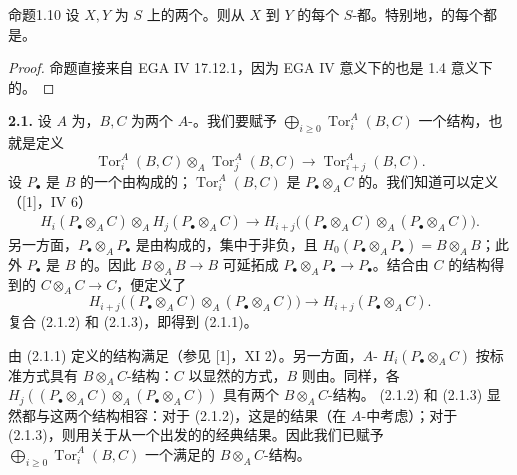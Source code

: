 \begin{SGAresult}{命题}{1.10}
设 $X,Y$ 为 $S$ 上的两个。则从 $X$ 到 $Y$ 的每个 $S$-都。特别地，的每个都是。
\end{SGAresult}
\begin{proof}
命题直接来自 EGA IV 17.12.1，因为 EGA IV 意义下的也是 1.4 意义下的。
\end{proof}

\textbf{2.1.} 设 $A$ 为，$B,C$ 为两个 $A$-。我们要赋予 $\bigoplus_{i\geq0}\operatorname{Tor}_i^A(B,C)$ 一个结构，也就是定义
\[
\operatorname{Tor}_i^A(B,C)\otimes_A\operatorname{Tor}_j^A(B,C)\longrightarrow\operatorname{Tor}_{i+j}^A(B,C).\tag{2.1.1}
\]
设 $P_\bullet$ 是 $B$ 的一个由构成的；$\operatorname{Tor}_i^A(B,C)$ 是 $P_\bullet\otimes_A C$ 的。我们知道可以定义（[1]，IV 6）
\[
\begin{split}
H_i(P_\bullet\otimes_A C)\otimes_A H_j(P_\bullet\otimes_A C)
\longrightarrow H_{i+j}\bigl((P_\bullet\otimes_A C)\otimes_A(P_\bullet\otimes_A C)\bigr).
\end{split}\tag{2.1.2}
\]
另一方面，$P_\bullet\otimes_A P_\bullet$ 是由构成的，集中于非负，且 $H_0(P_\bullet\otimes_A P_\bullet)=B\otimes_A B$；此外 $P_\bullet$ 是 $B$ 的。因此 $B\otimes_A B\to B$ 可延拓成 $P_\bullet\otimes_A P_\bullet\to P_\bullet$。结合由 $C$ 的结构得到的 $C\otimes_A C\to C$，便定义了
\[
H_{i+j}\bigl((P_\bullet\otimes_A C)\otimes_A(P_\bullet\otimes_A C)\bigr)
\longrightarrow H_{i+j}(P_\bullet\otimes_A C).\tag{2.1.3}
\]
复合 (2.1.2) 和 (2.1.3)，即得到 (2.1.1)。

由 (2.1.1) 定义的结构满足（参见 [1]，XI 2）。另一方面，$A$- $H_i(P_\bullet\otimes_A C)$ 按标准方式具有 $B\otimes_A C$-结构：$C$ 以显然的方式，$B$ 则由。同样，各 $H_j((P_\bullet\otimes_A C)\otimes_A(P_\bullet\otimes_A C))$ 具有两个 $B\otimes_A C$-结构。 (2.1.2) 和 (2.1.3) 显然都与这两个结构相容：对于 (2.1.2)，这是的结果（在 $A$-中考虑）；对于 (2.1.3)，则用关于从一个出发的的经典结果。因此我们已赋予 $\bigoplus_{i\geq0}\operatorname{Tor}_i^A(B,C)$ 一个满足的 $B\otimes_A C$-结构。

